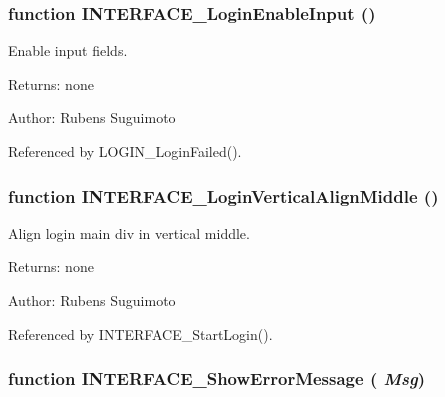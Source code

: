 \subsubsection[INTERFACE\_\-LoginEnableInput]{\setlength{\rightskip}{0pt plus 5cm}function INTERFACE\_\-LoginEnableInput ()}\label{interface_2login_8js_fc5deda592da04f2d13a4e0c0e8a84f4}


Enable input fields. 

\begin{Desc}
\item[Returns:]none \end{Desc}
\begin{Desc}
\item[Author:]Rubens Suguimoto \end{Desc}


Referenced by LOGIN\_\-LoginFailed().
\subsubsection[INTERFACE\_\-LoginVerticalAlignMiddle]{\setlength{\rightskip}{0pt plus 5cm}function INTERFACE\_\-LoginVerticalAlignMiddle ()}\label{interface_2login_8js_6b90c74538273942ad883632f6f035cd}


Align login main div in vertical middle. 

\begin{Desc}
\item[Returns:]none \end{Desc}
\begin{Desc}
\item[Author:]Rubens Suguimoto \end{Desc}


Referenced by INTERFACE\_\-StartLogin().
\subsubsection[INTERFACE\_\-ShowErrorMessage]{\setlength{\rightskip}{0pt plus 5cm}function INTERFACE\_\-ShowErrorMessage ( {\em Msg})}\label{interface_2login_8js_211a4c21245d7dbe846811557425453f}


